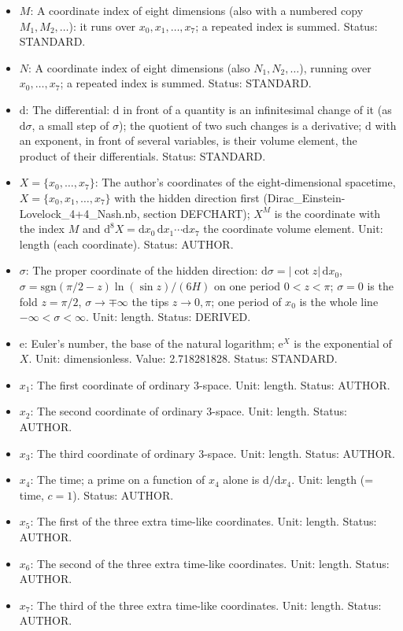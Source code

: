 \documentclass[
  10pt,
]{article}
\begin{document}
\begin{itemize}
  volume element). Unit: dimensionless. Status: AUTHOR.
\item
  \(M\): A coordinate index of eight dimensions (also with a numbered
  copy \(M_1, M_2, \dots\)): it runs over \(x_0, x_1, \dots, x_7\); a
  repeated index is summed. Status: STANDARD.
\item
  \(N\): A coordinate index of eight dimensions (also
  \(N_1, N_2, \dots\)), running over \(x_0, \dots, x_7\); a repeated
  index is summed. Status: STANDARD.
\item
  \(\mathrm{d}\): The differential: \(\mathrm{d}\) in front of a
  quantity is an infinitesimal change of it (as \(\mathrm{d}\sigma\), a
  small step of \(\sigma\)); the quotient of two such changes is a
  derivative; \(\mathrm{d}\) with an exponent, in front of several
  variables, is their volume element, the product of their
  differentials. Status: STANDARD.
\item
  \(X = \{x_0, \dots, x_7\}\): The author's coordinates of the
  eight-dimensional spacetime, \(X = \{x_0, x_1, \dots, x_7\}\) with the
  hidden direction first (Dirac\_Einstein-Lovelock\_4+4\_Nash.nb,
  section DEFCHART); \(X^M\) is the coordinate with the index \(M\) and
  \(\mathrm{d}^8X = \mathrm{d}x_0\,\mathrm{d}x_1\cdots\mathrm{d}x_7\)
  the coordinate volume element. Unit: length (each coordinate). Status:
  AUTHOR.
\item
  \(\sigma\): The proper coordinate of the hidden direction:
  \(\mathrm{d}\sigma = \lvert\cot z\rvert\,\mathrm{d}x_0\),
  \(\sigma = \mathrm{sgn}(\pi/2 - z)\ln(\sin z)/(6H)\) on one period
  \(0 < z < \pi\); \(\sigma = 0\) is the fold \(z = \pi/2\),
  \(\sigma \to \mp\infty\) the tips \(z \to 0, \pi\); one period of
  \(x_0\) is the whole line \(-\infty < \sigma < \infty\). Unit: length.
  Status: DERIVED.
\item
  \(\mathrm{e}\): Euler's number, the base of the natural logarithm;
  \(\mathrm{e}^{X}\) is the exponential of \(X\). Unit: dimensionless.
  Value: 2.718281828. Status: STANDARD.
\item
  \(x_1\): The first coordinate of ordinary 3-space. Unit: length.
  Status: AUTHOR.
\item
  \(x_2\): The second coordinate of ordinary 3-space. Unit: length.
  Status: AUTHOR.
\item
  \(x_3\): The third coordinate of ordinary 3-space. Unit: length.
  Status: AUTHOR.
\item
  \(x_4\): The time; a prime on a function of \(x_4\) alone is
  \(\mathrm{d}/\mathrm{d}x_4\). Unit: length (= time, \(c = 1\)).
  Status: AUTHOR.
\item
  \(x_5\): The first of the three extra time-like coordinates. Unit:
  length. Status: AUTHOR.
\item
  \(x_6\): The second of the three extra time-like coordinates. Unit:
  length. Status: AUTHOR.
\item
  \(x_7\): The third of the three extra time-like coordinates. Unit:
  length. Status: AUTHOR.
\end{itemize}
\end{document}
